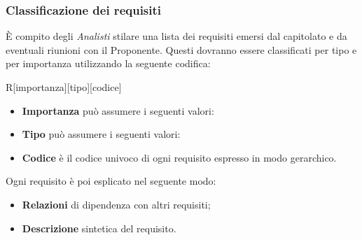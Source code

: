     \subsubsection{Classificazione dei requisiti}
      È compito degli \emph{Analisti} stilare una lista dei requisiti emersi dal capitolato e da eventuali riunioni con il Proponente. Questi dovranno essere
      classificati per tipo e per importanza utilizzando la seguente codifica:
      \begin{center}
        R[importanza][tipo][codice]
      \end{center}
      \begin{itemize}
        \item \textbf{Importanza} può assumere i seguenti valori:
          \bgroup
          \egroup
        \item \textbf{Tipo} può assumere i seguenti valori:
          \bgroup
          \egroup
        \item \textbf{Codice} è il codice univoco di ogni requisito espresso in modo gerarchico.
      \end{itemize}
      Ogni requisito è poi esplicato nel seguente modo:
      \begin{itemize}
        \item \textbf{Relazioni} di dipendenza con altri requisiti;
        \item \textbf{Descrizione} sintetica del requisito.
      \end{itemize}
